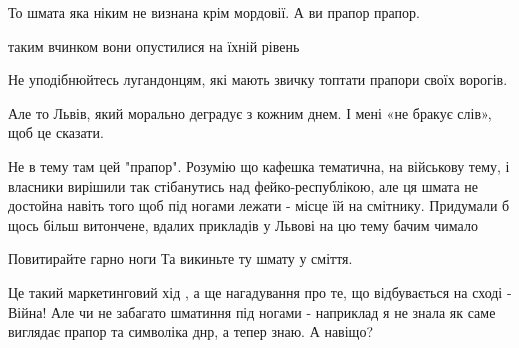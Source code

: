 \begin{itemize}
То шмата яка ніким не визнана крім мордовії. А ви прапор прапор.

 
таким вчинком вони опустилися на їхній рівень

 
Не уподібнюйтесь лугандонцям, які мають звичку топтати прапори своїх ворогів.

Але то Львів, який морально деградує з кожним днем. І мені «не бракує слів»,
щоб це сказати.

 

Не в тему там цей "прапор". Розумію що кафешка тематична, на військову тему, і
власники вирішили так стібанутись над фейко-республікою, але ця шмата не
достойна навіть того щоб під ногами лежати - місце їй на смітнику. Придумали б
щось більш витончене, вдалих прикладів у Львові на цю тему бачим чимало \Smiley[1.0][yellow]

 
Повитирайте гарно ноги
Та викиньте ту шмату у сміття.


 

Це такий маркетинговий хід , а ще нагадування про те, що відбувається на сході
- Війна! Але чи не забагато шматиння під ногами - наприклад я не знала як саме
виглядає прапор та символіка днр, а тепер знаю. А навіщо?



\end{itemize}
